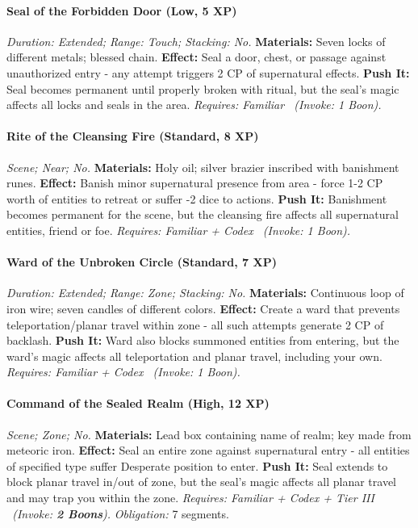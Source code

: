 \documentclass[12pt,twoside]{book}
\begin{document}
\paragraph{Seal of the Forbidden Door (Low, 5 XP)} \emph{Duration: Extended; Range: Touch; Stacking: No.}
\textbf{Materials:} Seven locks of different metals; blessed chain.
\textbf{Effect:} Seal a door, chest, or passage against unauthorized entry - any attempt triggers 2 CP of supernatural effects.
\textbf{Push It:} Seal becomes permanent until properly broken with ritual, but the seal's magic affects all locks and seals in the area.
\emph{Requires: Familiar \ (\textit{Invoke:} 1 Boon).}
\paragraph{Rite of the Cleansing Fire (Standard, 8 XP)} \emph{Scene; Near; No.}
\textbf{Materials:} Holy oil; silver brazier inscribed with banishment runes.
\textbf{Effect:} Banish minor supernatural presence from area - force 1-2 CP worth of entities to retreat or suffer -2 dice to actions.
\textbf{Push It:} Banishment becomes permanent for the scene, but the cleansing fire affects all supernatural entities, friend or foe.
\emph{Requires: Familiar + Codex \ (\textit{Invoke:} 1 Boon).}
\paragraph{Ward of the Unbroken Circle (Standard, 7 XP)} \emph{Duration: Extended; Range: Zone; Stacking: No.}
\textbf{Materials:} Continuous loop of iron wire; seven candles of different colors.
\textbf{Effect:} Create a ward that prevents teleportation/planar travel within zone - all such attempts generate 2 CP of backlash.
\textbf{Push It:} Ward also blocks summoned entities from entering, but the ward's magic affects all teleportation and planar travel, including your own.
\emph{Requires: Familiar + Codex \ (\textit{Invoke:} 1 Boon).}
\paragraph{Command of the Sealed Realm (High, 12 XP)} \emph{Scene; Zone; No.}
\textbf{Materials:} Lead box containing name of realm; key made from meteoric iron.
\textbf{Effect:} Seal an entire zone against supernatural entry - all entities of specified type suffer Desperate position to enter.
\textbf{Push It:} Seal extends to block planar travel in/out of zone, but the seal's magic affects all planar travel and may trap you within the zone.
\emph{Requires: Familiar + Codex + Tier III \ (\textit{Invoke:} \textbf{2 Boons}).}
\emph{Obligation:} 7 segments.
\end{document}

